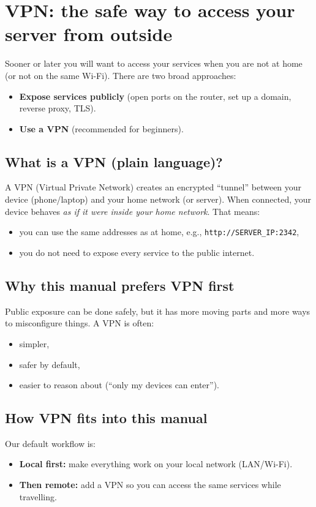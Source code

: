 \section{VPN: the safe way to access your server from outside}
Sooner or later you will want to access your services when you are not at home (or not on the same Wi-Fi).
There are two broad approaches:
\begin{itemize}[leftmargin=*]
  \item \textbf{Expose services publicly} (open ports on the router, set up a domain, reverse proxy, TLS).
  \item \textbf{Use a VPN} (recommended for beginners).
\end{itemize}

\subsection{What is a VPN (plain language)?}
A VPN (Virtual Private Network) creates an encrypted ``tunnel'' between your device (phone/laptop) and your home network (or server).
When connected, your device behaves \emph{as if it were inside your home network}.
That means:
\begin{itemize}[leftmargin=*]
  \item you can use the same addresses as at home, e.g., \texttt{http://SERVER\_IP:2342},
  \item you do not need to expose every service to the public internet.
\end{itemize}

\subsection{Why this manual prefers VPN first}
Public exposure can be done safely, but it has more moving parts and more ways to misconfigure things.
A VPN is often:
\begin{itemize}[leftmargin=*]
  \item simpler,
  \item safer by default,
  \item easier to reason about (``only my devices can enter'').
\end{itemize}



\subsection{How VPN fits into this manual}
Our default workflow is:
\begin{itemize}[leftmargin=*]
  \item \textbf{Local first:} make everything work on your local network (LAN/Wi-Fi).
  \item \textbf{Then remote:} add a VPN so you can access the same services while travelling.
\end{itemize}

